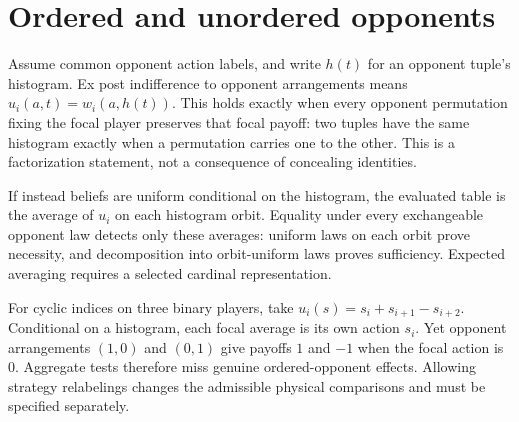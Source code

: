\section{Ordered and unordered opponents}
Assume common opponent action labels, and write $h(t)$ for an opponent tuple's
histogram. Ex post indifference to opponent arrangements means
$u_i(a,t)=w_i(a,h(t))$. This holds exactly when every opponent permutation
fixing the focal player preserves that focal payoff: two tuples have the same
histogram exactly when a permutation carries one to the other. This is a
factorization statement, not a consequence of concealing identities.

If instead beliefs are uniform conditional on the histogram, the evaluated
table is the average of $u_i$ on each histogram orbit. Equality under every
exchangeable opponent law detects only these averages: uniform laws on each
orbit prove necessity, and decomposition into orbit-uniform laws proves
sufficiency. Expected averaging requires a selected cardinal representation.

For cyclic indices on three binary players, take
$u_i(s)=s_i+s_{i+1}-s_{i+2}$. Conditional on a histogram, each focal average is
its own action $s_i$. Yet opponent arrangements $(1,0)$ and $(0,1)$ give
payoffs $1$ and $-1$ when the focal action is 0. Aggregate tests therefore
miss genuine ordered-opponent effects. Allowing strategy relabelings changes
the admissible physical comparisons and must be specified separately.
